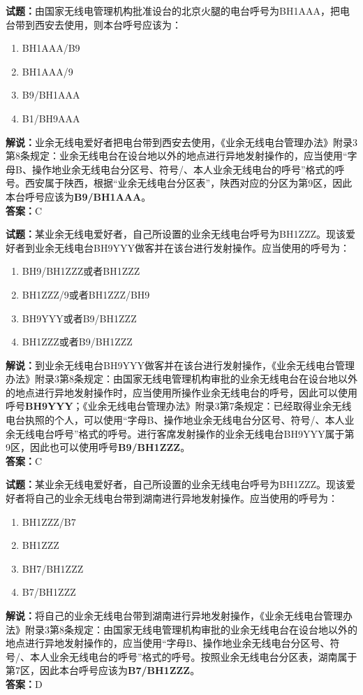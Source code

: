 \documentclass{ctexbook}
\begin{document}
\vspace{\baselineskip}

\noindent\textbf{试题：}由国家无线电管理机构批准设台的北京火腿的电台呼号为BH1AAA，把电台带到西安去使用，则本台呼号应该为：
\begin{enumerate}[leftmargin=3em]
  \item BH1AAA/B9
  \item BH1AAA/9
  \item B9/BH1AAA
  \item B1/BH9AAA
\end{enumerate}
\noindent\textbf{解说：}业余无线电爱好者把电台带到西安去使用，《业余无线电台管理办法》附录3第8条规定：业余无线电台在设台地以外的地点进行异地发射操作的，应当使用“字母B、操作地业余无线电台分区号、符号/、本人业余无线电台的呼号”格式的呼号。西安属于陕西，根据“业余无线电台分区表”，陕西对应的分区为第9区，因此本台呼号应该为\textbf{B9/BH1AAA}。\\\noindent\textbf{答案：}C

\vspace{\baselineskip}

\noindent\textbf{试题：}某业余无线电爱好者，自己所设置的业余无线电台呼号为BH1ZZZ。现该爱好者到业余无线电台BH9YYY做客并在该台进行发射操作。应当使用的呼号为：
\begin{enumerate}[leftmargin=3em]
  \item BH9/BH1ZZZ或者BH1ZZZ
  \item BH1ZZZ/9或者BH1ZZZ/BH9
  \item BH9YYY或者B9/BH1ZZZ
  \item BH1ZZZ或者B9/BH1ZZZ
\end{enumerate}
\noindent\textbf{解说：}到业余无线电台BH9YYY做客并在该台进行发射操作，《业余无线电台管理办法》附录3第8条规定：由国家无线电管理机构审批的业余无线电台在设台地以外的地点进行异地发射操作时，应当使用所操作业余无线电台的呼号，因此可以使用呼号\textbf{BH9YYY}；《业余无线电台管理办法》附录3第7条规定：已经取得业余无线电台执照的个人，可以使用“字母B、操作地业余无线电台分区号、符号/、本人业余无线电台呼号”格式的呼号。进行客席发射操作的业余无线电台BH9YYY属于第9区，因此也可以使用呼号\textbf{B9/BH1ZZZ}。\\\noindent\textbf{答案：}C

\vspace{\baselineskip}

\noindent\textbf{试题：}某业余无线电爱好者，自己所设置的业余无线电台呼号为BH1ZZZ。现该爱好者将自己的业余无线电台带到湖南进行异地发射操作。应当使用的呼号为：
\begin{enumerate}[leftmargin=3em]
  \item BH1ZZZ/B7
  \item BH1ZZZ
  \item BH7/BH1ZZZ
  \item B7/BH1ZZZ
\end{enumerate}
\noindent\textbf{解说：}将自己的业余无线电台带到湖南进行异地发射操作，《业余无线电台管理办法》附录3第8条规定：由国家无线电管理机构审批的业余无线电台在设台地以外的地点进行异地发射操作的，应当使用“字母B、操作地业余无线电台分区号、符号/、本人业余无线电台的呼号”格式的呼号。按照业余无线电台分区表，湖南属于第7区，因此本台呼号应该为\textbf{B7/BH1ZZZ}。\\\noindent\textbf{答案：}D
\end{document}
